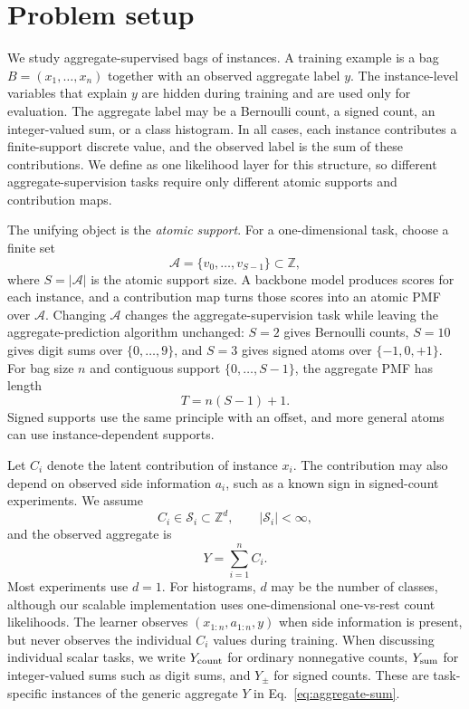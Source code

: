 \section{Problem setup}
\label{sec:problem-setup}

We study aggregate-supervised bags of instances.
A training example is a bag $B=(x_1,\ldots,x_n)$ together with an observed aggregate label $y$.
The instance-level variables that explain $y$ are hidden during training and are used only for evaluation.
The aggregate label may be a Bernoulli count, a signed count, an integer-valued sum, or a class histogram.
In all cases, each instance contributes a finite-support discrete value, and the observed label is the sum of these contributions.
We define \method{} as one likelihood layer for this structure, so different aggregate-supervision tasks require only different atomic supports and contribution maps.

The unifying object is the \emph{atomic support}.
For a one-dimensional task, choose a finite set
\begin{equation}
  \mathcal{A}=\{v_0,\ldots,v_{S-1}\}\subset\mathbb{Z},
\end{equation}
where $S=|\mathcal{A}|$ is the atomic support size.
A backbone model produces scores for each instance, and a contribution map turns those scores into an atomic PMF over $\mathcal{A}$.
Changing $\mathcal{A}$ changes the aggregate-supervision task while leaving the aggregate-prediction algorithm unchanged:
$S=2$ gives Bernoulli counts, $S=10$ gives digit sums over $\{0,\ldots,9\}$, and $S=3$ gives signed atoms over $\{-1,0,+1\}$.
For bag size $n$ and contiguous support $\{0,\ldots,S-1\}$, the aggregate PMF has length
\begin{equation}
  T = n(S-1)+1.
  \label{eq:aggregate-support-width}
\end{equation}
Signed supports use the same principle with an offset, and more general atoms can use instance-dependent supports.

Let $C_i$ denote the latent contribution of instance $x_i$.
The contribution may also depend on observed side information $a_i$, such as a known sign in signed-count experiments.
We assume
\begin{equation}
  C_i \in \mathcal{S}_i \subset \mathbb{Z}^d,
  \qquad
  |\mathcal{S}_i| < \infty,
\end{equation}
and the observed aggregate is
\begin{equation}
  Y = \sum_{i=1}^n C_i.
  \label{eq:aggregate-sum}
\end{equation}
Most experiments use $d=1$.
For histograms, $d$ may be the number of classes, although our scalable implementation uses one-dimensional one-vs-rest count likelihoods.
The learner observes $(x_{1:n},a_{1:n},y)$ when side information is present, but never observes the individual $C_i$ values during training.
When discussing individual scalar tasks, we write $Y_{\rm count}$ for ordinary nonnegative counts, $Y_{\rm sum}$ for integer-valued sums such as digit sums, and $Y_{\pm}$ for signed counts.
These are task-specific instances of the generic aggregate $Y$ in Eq.~\eqref{eq:aggregate-sum}.

